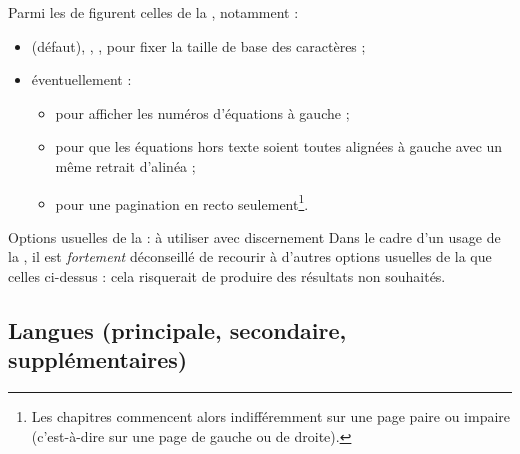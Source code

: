 Parmi les  de \yatcl{} figurent celles de la ,
notamment :
\begin{itemize}
\item{}%
  \docAuxKey{10pt} (défaut), \docAuxKey{11pt}, \docAuxKey{12pt}, pour fixer
  la taille de base des caractères ;
\item éventuellement :
  \begin{itemize}
  \item{}%
     pour afficher les numéros d'équations à gauche ;
  \item{}%
     pour que les équations hors texte soient toutes
    alignées à gauche avec un même retrait d'alinéa ;
  \item%
     pour une \gls{pagination} en recto
    seulement\footnote{Les chapitres commencent alors indifféremment sur une
      page paire ou impaire (c'est-à-dire sur une page
      de gauche ou de droite).}.
  \end{itemize}
\end{itemize}
\begin{dbwarning}{Options usuelles de la  : à utiliser avec
    discernement}{}
  Dans le cadre d'un usage de la \yatCl{}, il est \emph{fortement} déconseillé de
  recourir à d'autres options usuelles de la  que celles
  ci-dessus : cela risquerait de produire des résultats non souhaités.
\end{dbwarning}

%

\subsection{Langues (principale, secondaire, supplémentaires)}
\label{sec-langues}%
%
%
%
%
%

